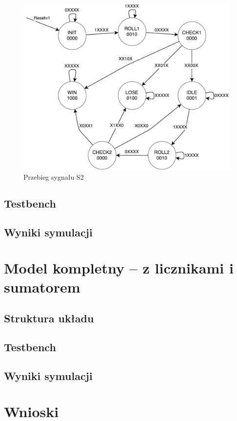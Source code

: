 \documentclass[a4paper,11pt,fleqn]{article}
\begin{document}
\begin{figure}[h]
\centering
\includegraphics[width=\textwidth]{diceGameDiagram.pdf}
\caption{Przebieg sygnału S2}
\label{diagram:dicegame}
\end{figure}

\subsection{Testbench}

\subsection{Wyniki symulacji}


\section{Model kompletny -- z licznikami i sumatorem}

\subsection{Struktura układu}
\subsection{Testbench}
\subsection{Wyniki symulacji}


\section{Wnioski}
\end{document}
